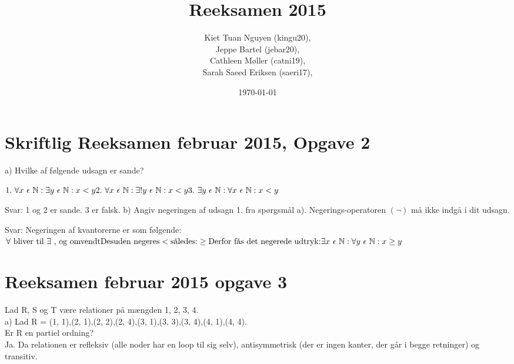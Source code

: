 \documentclass{article}
\title{Reeksamen 2015}
\author{Kiet Tuan Nguyen (kingu20), \\Jeppe Bartel (jebar20),\\Cathleen Møller (catni19),\\Sarah Saeed Eriksen (saeri17), \\}
\date{\today}
\begin{document}
\maketitle

\section{Skriftlig Reeksamen februar 2015, Opgave 2}
\newline
a) Hvilke af følgende udsagn er sande?
\begin{flushleft} \begin{math} 
1.\ \forall x \ \epsilon \ \Bbb N : \exists y \ \epsilon \ \Bbb N: x < y \newline
2.\ \forall x \ \epsilon \ \Bbb N : \exists ! y \ \epsilon \ \Bbb N: x < y \newline
3.\ \exists y \ \epsilon \ \Bbb N : \forall x \ \epsilon \ \Bbb N: x < y \newline
\end{math}

Svar: 1 og 2 er sande. 3 er falsk. \newline \newline
b) Angiv negeringen af udsagn 1. fra spørgsmål a). Negerings-operatoren $(\neg)$ må ikke indgå i dit udsagn.\newline

Svar:\newline
Negeringen af kvantorerne er som følgende:\newline
\begin{math}
\forall \ \textrm{bliver til} \ \exists \ \textrm{, og omvendt} \newline
\textrm{Desuden negeres} < \textrm{således:}\geq \newline
\textrm{Derfor fås det negerede udtryk:} \newline
\exists x \ \epsilon \ \mathbb N : \forall y \ \epsilon \ \mathbb N : x \geq y
\end{math}

\end{flushleft}


\section{Reeksamen februar 2015 opgave 3}
Lad R, S og T være relationer på mængden {1, 2, 3, 4}.\\

a) 
Lad R =  {(1, 1),(2, 1),(2, 2),(2, 4),(3, 1),(3, 3),(3, 4),(4, 1),(4, 4)}.\\
Er R en partiel ordning?\\
Ja. Da relationen er refleksiv (alle noder har en loop til sig selv), antisymmetrisk (der er ingen kanter, der går i begge retninger) og transitiv.\\
\end{document}
